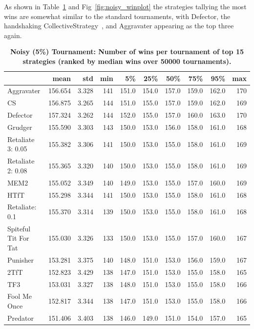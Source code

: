 \documentclass[10pt,letterpaper]{article}
\begin{document}
As shown in Table~\ref{tbl:noisy_wins_top_winners} and
Fig~\ref{fig:noisy_winplot} the strategies tallying the most wins are
somewhat similar to the standard tournaments, with Defector, the handshaking
CollectiveStrategy~\cite{Li2009}, and Aggravater appearing as the top three again.

\begin{table}[!hbtp]
    \centering
        \caption{\bf Noisy (5\%) Tournament: Number of wins per tournament
        of top 15 strategies (ranked by median wins over
        50000 tournaments).}
        \footnotesize
\begin{tabular}{lrrrrrrrrr}
\toprule
{} &     mean &    std &  min &     5\% &    25\% &    50\% &    75\% &    95\% &  max \\
\midrule
Aggravater           &  156.654 &  3.328 &  141 &  151.0 &  154.0 &  157.0 &  159.0 &  162.0 &  170 \\
CS                   &  156.875 &  3.265 &  144 &  151.0 &  155.0 &  157.0 &  159.0 &  162.0 &  169 \\
Defector             &  157.324 &  3.262 &  144 &  152.0 &  155.0 &  157.0 &  160.0 &  163.0 &  170 \\
Grudger              &  155.590 &  3.303 &  143 &  150.0 &  153.0 &  156.0 &  158.0 &  161.0 &  168 \\
Retaliate 3: 0.05    &  155.382 &  3.306 &  141 &  150.0 &  153.0 &  155.0 &  158.0 &  161.0 &  169 \\
Retaliate 2: 0.08    &  155.365 &  3.320 &  140 &  150.0 &  153.0 &  155.0 &  158.0 &  161.0 &  169 \\
MEM2                 &  155.052 &  3.349 &  140 &  149.0 &  153.0 &  155.0 &  157.0 &  160.0 &  169 \\
HTfT                 &  155.298 &  3.344 &  141 &  150.0 &  153.0 &  155.0 &  158.0 &  161.0 &  168 \\
Retaliate: 0.1       &  155.370 &  3.314 &  139 &  150.0 &  153.0 &  155.0 &  158.0 &  161.0 &  168 \\
Spiteful Tit For Tat &  155.030 &  3.326 &  133 &  150.0 &  153.0 &  155.0 &  157.0 &  160.0 &  167 \\
Punisher             &  153.281 &  3.375 &  140 &  148.0 &  151.0 &  153.0 &  156.0 &  159.0 &  167 \\
2TfT                 &  152.823 &  3.429 &  138 &  147.0 &  151.0 &  153.0 &  155.0 &  158.0 &  165 \\
TF3                  &  153.031 &  3.327 &  138 &  148.0 &  151.0 &  153.0 &  155.0 &  158.0 &  166 \\
Fool Me Once         &  152.817 &  3.344 &  138 &  147.0 &  151.0 &  153.0 &  155.0 &  158.0 &  166 \\
Predator             &  151.406 &  3.403 &  138 &  146.0 &  149.0 &  151.0 &  154.0 &  157.0 &  165 \\
\bottomrule
\end{tabular}
        \label{tbl:noisy_wins_top_winners}
\end{table}
\end{document}
